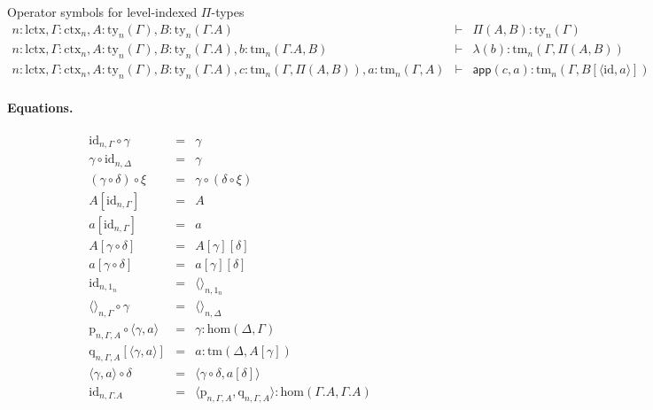 \documentclass[submission,copyright,creativecommons]{eptcs}
\newcommand{\id}{\mathsf{id}}
\newcommand{\app}[2]{{#1\,#2}} %
\def\sub{\mathrm{hom}}
\def\id{\mathrm{id}}
\def\lctx{\mathrm{lctx}}
\newcommand{\ctx}{\mathrm{ctx}}
\newcommand{\ty}{\mathrm{ty}}
\newcommand{\tm}{\mathrm{tm}}
\newcommand{\tuple}[1]{\langle #1 \rangle}
\newcommand{\cext}{.}
\def\p{\mathrm{p}}
\def\q{\mathrm{q}}
\def\app{\mathsf{app}}
\begin{document}
Operator symbols for level-indexed $\Pi$-types
\begin{eqnarray*}
n : \lctx, \Gamma : \ctx_n, A : \ty_n(\Gamma), B : \ty_n(\Gamma.A)&\vdash& \Pi(A,B) : \ty_n(\Gamma)\\
n : \lctx, \Gamma : \ctx_n, A : \ty_n(\Gamma), B : \ty_n(\Gamma.A), b : \tm_n(\Gamma.A, B) &\vdash& \lambda(b) : \tm_n(\Gamma,\Pi(A,B))\\
n : \lctx, \Gamma : \ctx_n, A : \ty_n(\Gamma), B : \ty_n(\Gamma.A), c :  \tm_n(\Gamma,\Pi(A,B)), a : \tm_n(\Gamma, A) &\vdash& \app(c,a) : \tm_n(\Gamma, B[\tuple{\id,a}])
\end{eqnarray*}

\paragraph{Equations.}
\begin{eqnarray*}
\id_{n,\Gamma} \circ \gamma &=& \gamma \\
 \gamma \circ \id_{n,\Delta} &=& \gamma \\
(\gamma \circ \delta) \circ \xi &=& \gamma \circ (\delta \circ \xi)\\
A[\id_{n,\Gamma}] &=& A
\\
a[\id_{n,\Gamma}] &=& a%
\\
A[\gamma\circ\delta] &=& A[\gamma][\delta]
\\
a[\gamma\circ\delta] &=& a[\gamma][\delta]
\\
\id_{n,1_n} &=& \tuple{}_{n,1_n}
\\
\tuple{}_{n,\Gamma}\circ\gamma &=& \tuple{}_{n,\Delta}%
\\
\p_{n,\Gamma,A}\circ\tuple{\gamma,a} &=& \gamma : \sub(\Delta,\Gamma)\\
\q_{n,\Gamma,A}[\tuple{\gamma,a}] &=& a : \tm(\Delta,A[\gamma]) \\
\tuple{\gamma,a} \circ \delta &=& \tuple{\gamma\circ\delta,a[\delta]} \\
\id_{n,\Gamma\cext A} &=& \tuple{\p_{n,\Gamma,A},\q_{n,\Gamma,A}} : \sub(\Gamma\cext A,\Gamma\cext A)
\end{eqnarray*}
\end{document}
